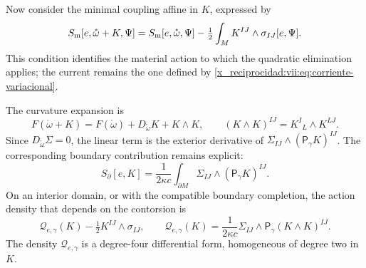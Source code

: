 \begin{HMTCompactSection}
Now consider the minimal coupling affine in \(K\), expressed by
\begin{equation}
 S_{\rm m}[e,\mathring\omega+K,\Psi]
 =S_{\rm m}[e,\mathring\omega,\Psi]
   -\tfrac12\int_M K^{IJ}\wedge\sigma_{IJ}[e,\Psi].
 \label{x_reciprocidad:vii:eq:materia-afin-contorsion}
\end{equation}
This condition identifies the material action to which the quadratic elimination applies; the current remains the one defined by \eqref{x_reciprocidad:vii:eq:corriente-variacional}.

The curvature expansion is
\begin{equation}
 F(\mathring\omega+K)
 =F(\mathring\omega)+D_{\mathring\omega}K+K\wedge K,
 \qquad (K\wedge K)^{IJ}=K^I{}_{L}\wedge K^{LJ}.
 \label{x_reciprocidad:vii:eq:curvatura-contorsion}
\end{equation}
Since \(D_{\mathring\omega}\Sigma=0\), the linear term is
the exterior derivative of \(\Sigma_{IJ}\wedge(\mathsf P_\gamma K)^{IJ}\).
The corresponding boundary contribution remains explicit:
\begin{equation}
 S_\partial[e,K]=\frac1{2\kappa c}
     \int_{\partial M}\Sigma_{IJ}\wedge(\mathsf P_\gamma K)^{IJ}.
 \label{x_reciprocidad:vii:eq:borde-contorsion}
\end{equation}
On an interior domain, or with the compatible boundary completion, the action density that depends on the contorsion is
\begin{equation}
 \mathcal Q_{e,\gamma}(K)-\tfrac12K^{IJ}\wedge\sigma_{IJ},
 \qquad
 \mathcal Q_{e,\gamma}(K)
  =\frac1{2\kappa c}\Sigma_{IJ}\wedge
                         \mathsf P_\gamma(K\wedge K)^{IJ}.
 \label{x_reciprocidad:vii:eq:forma-cuadratica-contorsion}
\end{equation}
The density \(\mathcal Q_{e,\gamma}\) is a degree-four differential form, homogeneous of degree two in \(K\).


\end{HMTCompactSection}
